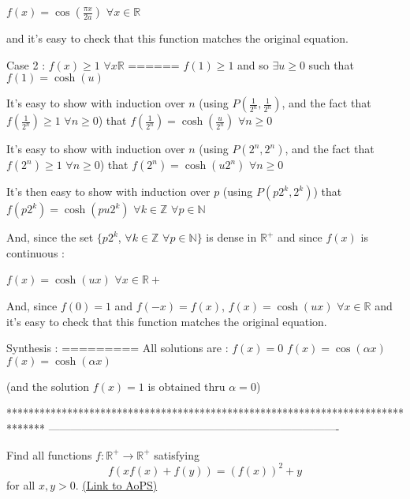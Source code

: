 \begin{solution}
$ f(x) = \cos(\frac {\pi x}{2a})$ $ \forall x\in\mathbb R$

and it's easy to check that this function matches the original equation.

Case 2 : $ f(x)\geq 1$ $ \forall x\mathbb R$
======
$ f(1)\geq 1$ and so $ \exists u \geq 0$ such that $ f(1) = \cosh(u)$

It's easy to show with induction over $ n$ (using $ P(\frac {1}{2^n},\frac {1}{2^n})$, and the fact that $ f(\frac {1}{2^n})\geq 1$ $ \forall n\geq 0$) that $ f(\frac {1}{2^n}) = \cosh(\frac {u}{2^n})$ $ \forall n\geq 0$

It's easy to show with induction over $ n$ (using $ P(2^n,2^n)$, and the fact that $ f(2^n)\geq 1$ $ \forall n\geq 0$) that $ f(2^n) = \cosh(u2^n)$ $ \forall n\geq 0$

It's then easy to show with induction over $ p$ (using $ P(p2^k,2^k)$) that $ f(p2^k) = \cosh(pu2^k)$ $ \forall k\in\mathbb Z$ $ \forall p\in\mathbb N$

And, since the set $ \{p2^k$, $ \forall k\in\mathbb Z$ $ \forall p\in\mathbb N\}$ is dense in $ \mathbb R^ +$ and since $ f(x)$ is continuous :

$ f(x) = \cosh(ux)$ $ \forall x\in\mathbb R +$

And, since $ f(0) = 1$ and $ f( - x) = f(x)$, $ f(x) = \cosh(ux)$ $ \forall x\in\mathbb R$
and it's easy to check that this function matches the original equation.

Synthesis :
=========
All solutions are :
$ f(x) = 0$
$ f(x) = \cos(\alpha x)$
$ f(x) = \cosh(\alpha x)$

(and the solution $ f(x) = 1$ is obtained thru $ \alpha = 0$)
\end{solution}
*******************************************************************************
-------------------------------------------------------------------------------

\begin{problem}
	Find all functions $ f: \mathbb{R^+}\rightarrow \mathbb{R^+}$ satisfying \[ f(xf(x)+f(y))=(f(x))^2+y\] for all $ x,y>0.$
	\flushright \href{https://artofproblemsolving.com/community/c6h267843}{(Link to AoPS)}
\end{problem}



